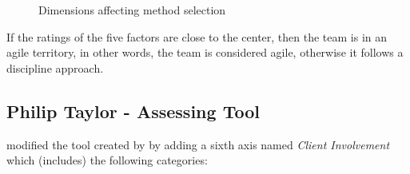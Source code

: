 \begin{figure}[H]
{\caption{Dimensions affecting method selection} 
\label{fig:boehm_turner_5axes}}
\end{figure}

If the ratings of the five factors are close to the center, then the team is in an agile territory, in other words, the team is considered agile, otherwise it follows a discipline approach.

\subsection{Philip Taylor - Assessing Tool} 
\citet{taylor} modified the tool created by \citet{1231450} by adding a sixth axis named \textit{Client Involvement} which (includes) the following categories:

